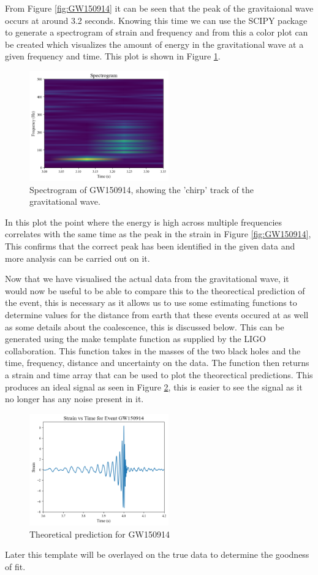 \documentclass[]{article}
\begin{document}
From Figure \ref{fig:GW150914} it can be seen that the peak of the gravitaional wave occurs at
around 3.2 seconds.
Knowing this time we can use the SCIPY package to generate a spectrogram of strain and frequency and from this a color plot can be
created which visualizes the amount of energy in the gravitational wave at a given
frequency and time. This plot is shown in Figure \ref{fig:spectrogram}.
\begin{figure}[h]
    \includegraphics[width=6cm]{images/spectrogram_gw150914.png}
    \caption{Spectrogram of GW150914, showing the 'chirp' track of the gravitational wave.}
    \label{fig:spectrogram}
\end{figure}
\newline
In this plot the point where the energy is high across multiple frequencies
correlates with the same time as the peak in the strain in Figure \ref{fig:GW150914}, This confirms that the correct peak has been identified
in the given data and more analysis can be carried out on it.

Now that we have visualised the actual data from the gravitational wave, it would now
be useful to be able to compare this to the theorectical prediction of the event, this is necessary as it allows us
to use some estimating functions to determine values for the distance from earth that these events occured at as well as some
details about the coalescence, this is discussed below.
This can be generated using the make template function as supplied by the LIGO
collaboration. This function takes in the masses of the two black holes and
the time, frequency, distance and uncertainty on the data. The function then returns
a strain and time array that can be used to plot the theorectical predictions.
This produces an ideal signal as seen in Figure \ref{fig:ideal_signal}, this is easier to see the signal as
it no longer has any noise present in it.
\begin{figure}[h]
    \includegraphics[width=6cm]{images/ideal_signal_gw150914.png}
    \caption{Theoretical prediction for GW150914}
    \label{fig:ideal_signal}
\end{figure}
\newline
Later this template will be overlayed on the true data to determine the goodness of fit.
\end{document}
